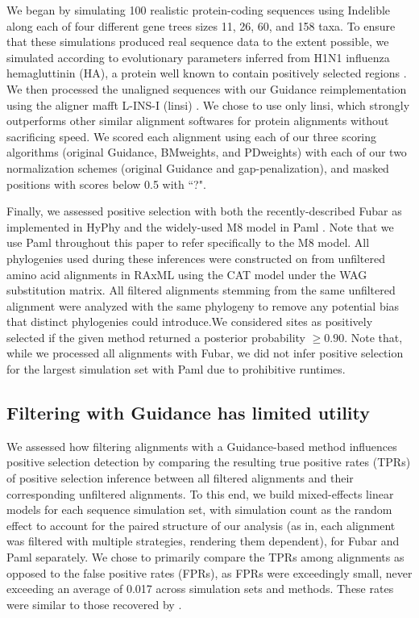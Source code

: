 \documentclass[10pt]{article}
\begin{document}
We began by simulating 100 realistic protein-coding sequences using Indelible \citep{Fletcher2009} along each of four different gene trees sizes 11, 26, 60, and 158 taxa. To ensure that these simulations produced real sequence data to the extent possible, we simulated according to evolutionary parameters inferred from H1N1 influenza hemagluttinin (HA), a protein well known to contain positively selected regions \citep{Meyer2012}. We then processed the unaligned sequences with our Guidance reimplementation using the aligner mafft L-INS-I (linsi) \citep{Katoh2005}. We chose to use only linsi, which strongly outperforms other similar alignment softwares for protein alignments \citep{Thompson2011,Nuin2006} without sacrificing speed. We scored each alignment using each of our three scoring algorithms (original Guidance, BMweights, and PDweights) with each of our two normalization schemes (original Guidance and gap-penalization), and masked positions with scores below 0.5 with ``?".

Finally, we assessed positive selection with both the recently-described Fubar \citep{Murrell2013} as implemented in HyPhy \citep{Pond2005} and the widely-used M8 model in Paml \citep{Yang2007}. Note that we use Paml throughout this paper to refer specifically to the M8 model.  All phylogenies used during these inferences were constructed on from unfiltered amino acid alignments in RAxML \citep{Stamatakis2006} using the CAT model under the WAG substitution matrix. All filtered alignments stemming from the same unfiltered alignment were analyzed with the same phylogeny to remove any potential bias that distinct phylogenies could introduce.We considered sites as positively selected if the given method returned a posterior probability $\geq0.90$. Note that, while we processed all alignments with Fubar, we did not infer positive selection for the largest simulation set with Paml due to prohibitive runtimes. 


\subsection*{Filtering with Guidance has limited utility}

We assessed how filtering alignments with a Guidance-based method influences positive selection detection by comparing the resulting true positive rates (TPRs) of positive selection inference between all filtered alignments and their corresponding unfiltered alignments. To this end, we build mixed-effects linear models for each sequence simulation set, with simulation count as the random effect to account for the paired structure of our analysis (as in, each alignment was filtered with multiple strategies, rendering them dependent), for Fubar and Paml separately. We chose to primarily compare the TPRs among alignments as opposed to the false positive rates (FPRs), as FPRs were exceedingly small, never exceeding an average of 0.017 across simulation sets and methods. These rates were similar to those recovered by \citep{Jordan2011}. 
\end{document}

